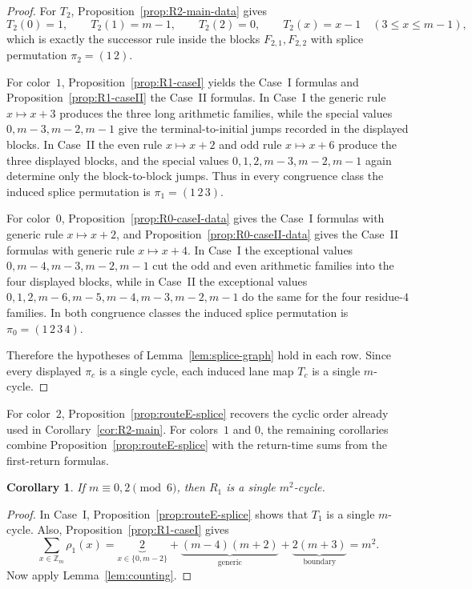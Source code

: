 \documentclass[11pt]{article}
\newtheorem{corollary}{Corollary}
\newcommand{\Zm}{\mathbb Z_m}
\begin{document}
\begin{proof}
For $T_2$, Proposition~\ref{prop:R2-main-data} gives
\[
T_2(0)=1,\qquad T_2(1)=m-1,\qquad T_2(2)=0,\qquad T_2(x)=x-1\quad (3\le x\le m-1),
\]
which is exactly the successor rule inside the blocks $F_{2,1},F_{2,2}$ with splice permutation $\pi_2=(1\,2)$.

For color~$1$, Proposition~\ref{prop:R1-caseI} yields the Case~I formulas and Proposition~\ref{prop:R1-caseII} the Case~II formulas.
In Case~I the generic rule $x\mapsto x+3$ produces the three long arithmetic families, while the special values $0,m-3,m-2,m-1$ give the terminal-to-initial jumps recorded in the displayed blocks.
In Case~II the even rule $x\mapsto x+2$ and odd rule $x\mapsto x+6$ produce the three displayed blocks, and the special values $0,1,2,m-3,m-2,m-1$ again determine only the block-to-block jumps.
Thus in every congruence class the induced splice permutation is $\pi_1=(1\,2\,3)$.

For color~$0$, Proposition~\ref{prop:R0-caseI-data} gives the Case~I formulas with generic rule $x\mapsto x+2$, and Proposition~\ref{prop:R0-caseII-data} gives the Case~II formulas with generic rule $x\mapsto x+4$.
In Case~I the exceptional values $0,m-4,m-3,m-2,m-1$ cut the odd and even arithmetic families into the four displayed blocks, while in Case~II the exceptional values $0,1,2,m-6,m-5,m-4,m-3,m-2,m-1$ do the same for the four residue-$4$ families.
In both congruence classes the induced splice permutation is $\pi_0=(1\,2\,3\,4)$.

Therefore the hypotheses of Lemma~\ref{lem:splice-graph} hold in each row.
Since every displayed $\pi_c$ is a single cycle, each induced lane map $T_c$ is a single $m$-cycle.
\end{proof}

For color~$2$, Proposition~\ref{prop:routeE-splice} recovers the cyclic order already used in Corollary~\ref{cor:R2-main}.
For colors~$1$ and $0$, the remaining corollaries combine Proposition~\ref{prop:routeE-splice} with the return-time sums from the first-return formulas.

\begin{corollary}\label{cor:R1-caseI}
If $m\equiv 0,2\pmod 6$, then $R_1$ is a single $m^2$-cycle.
\end{corollary}

\begin{proof}
In Case~I, Proposition~\ref{prop:routeE-splice} shows that $T_1$ is a single $m$-cycle.
Also, Proposition~\ref{prop:R1-caseI} gives
\[
\sum_{x\in \Zm}\rho_1(x)=\underbrace{2}_{x\in\{0,m{-}2\}}+\underbrace{(m-4)(m+2)}_{\text{generic}}+\underbrace{2(m+3)}_{\text{boundary}}=m^2.
\]
Now apply Lemma~\ref{lem:counting}.
\end{proof}
\end{document}
